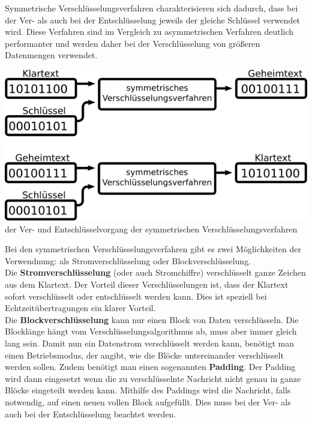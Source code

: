\documentclass[12pt,a4paper]{report}
\begin{document}
\begin{onehalfspace}
Symmetrische Verschlüsselungsverfahren charakterisieren sich dadurch, dass bei der Ver- als auch bei der Entschlüsselung jeweils der gleiche Schlüssel verwendet wird. Diese Verfahren sind im Vergleich zu asymmetrischen Verfahren deutlich performanter und werden daher bei der Verschlüsselung von größeren Datenmengen verwendet.\\

\begin{center}
\includegraphics[scale=3]{img/sym.png}\\
der Ver- und Entschlüsselvorgang der symmetrischen Verschlüsselungsverfahren
\end{center}

Bei den symmetrischen Verschlüsselungsverfahren gibt es zwei Möglichkeiten der Verwendnung: als Stromverschlüsselung oder Blockverschlüsselung.\\
Die \textbf{Stromverschlüsselung} (oder auch Stromchiffre) verschlüsselt ganze Zeichen aus dem Klartext. Der Vorteil dieser Verschlüsselungen ist, dass der Klartext sofort verschlüsselt oder entschlüsselt werden kann. Dies ist speziell bei Echtzeitübertragungen ein klarer Vorteil.\\
Die \textbf{Blockverschlüsselung} kann nur einen Block von Daten verschlüsseln. Die Blocklänge hängt vom Verschlüsselungsalgorithmus ab, muss aber immer gleich lang sein. Damit nun ein Datenstrom verschlüsselt werden kann, benötigt man einen Betriebsmodus, der angibt, wie die Blöcke untereinander verschlüsselt werden sollen. Zudem benötigt man einen sogenannten \textbf{Padding}. Der Padding wird dann eingesetzt wenn die zu verschlüsselnte Nachricht nicht genau in ganze Blöcke eingeteilt werden kann. Mithilfe des Paddings wird die Nachricht, falls notwendig, auf einen neuen vollen Block aufgefüllt. Dies muss bei der Ver- als auch bei der Entschlüsselung beachtet werden.\\


\end{onehalfspace}
\end{document}

